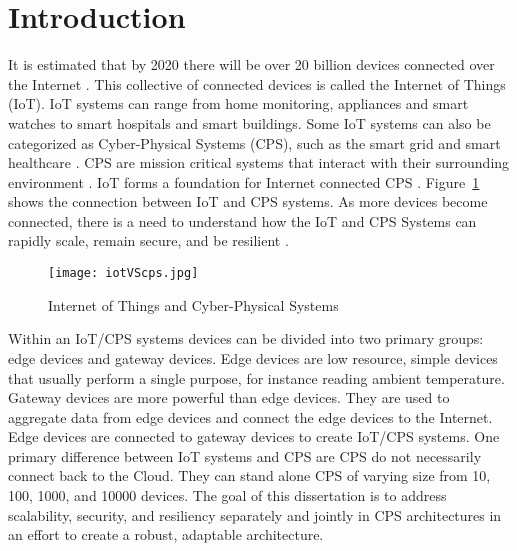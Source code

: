 \documentclass[../main.tex]{subfiles}
\begin{document}
\section{Introduction}

It is estimated that by 2020 there will be over 20 billion devices connected over the Internet \cite{gartner, juniper-research,stats-iot}. This collective of connected devices is called the Internet of Things (IoT). IoT systems can range from home monitoring, appliances and smart watches to smart hospitals and smart buildings. Some IoT systems can also be categorized as Cyber-Physical Systems (CPS), such as the smart grid and smart healthcare \cite{ideas2020,els,k-ieee}. CPS are mission critical systems that interact with their surrounding environment \cite{shi2011survey, baheti2011cyber,banerjee2012ensuring}. IoT forms a foundation for Internet connected CPS \cite{k-ieee}. Figure~\ref{fig:iot-v-cps} shows the connection between IoT and CPS systems. As more devices become connected, there is a need to understand how the IoT and CPS Systems can rapidly scale, remain secure, and be resilient \cite{6803220,7275445}. 


\begin{figure}[!htb]
    \centering
    \texttt{[image: iotVScps.jpg]}
    \caption{Internet of Things and Cyber-Physical Systems}
    \label{fig:iot-v-cps}
\end{figure}

Within an IoT/CPS systems devices can be divided into two primary groups: edge devices and gateway devices. Edge devices are low resource, simple devices that usually perform a single purpose, for instance reading ambient temperature. Gateway devices are more powerful than edge devices. They are used to aggregate data from edge devices and connect the edge devices to the Internet. Edge devices are connected to gateway devices to create IoT/CPS systems. One primary difference between IoT systems and CPS are CPS do not necessarily connect back to the Cloud. They can stand alone CPS of varying size from 10, 100, 1000, and 10000 devices. The goal of this dissertation is to address scalability, security, and resiliency separately and jointly in CPS architectures in an effort to create a robust, adaptable architecture. 
\end{document}
